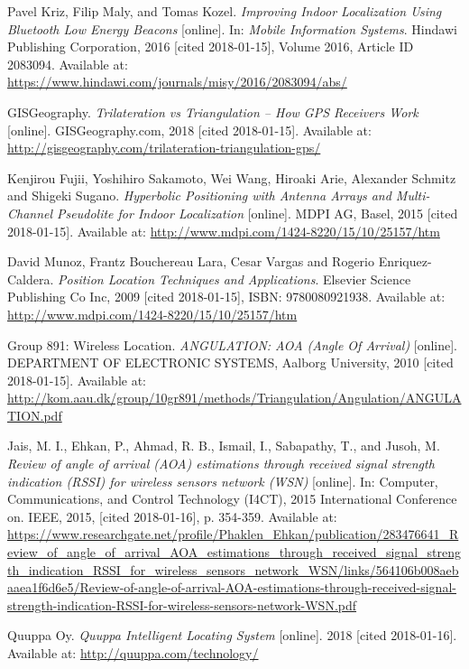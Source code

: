 \begin{thebibliography}{10}
Pavel Kriz, Filip Maly, and Tomas Kozel. \textit{Improving Indoor Localization Using Bluetooth Low Energy Beacons} [online]. In: \textit{Mobile Information Systems}. Hindawi Publishing Corporation, 2016 [cited 2018-01-15], Volume 2016, Article ID 2083094. Available at: \url{https://www.hindawi.com/journals/misy/2016/2083094/abs/}

GISGeography. \textit{Trilateration vs Triangulation – How GPS Receivers Work} [online]. GISGeography.com, 2018 [cited 2018-01-15]. Available at: \url{http://gisgeography.com/trilateration-triangulation-gps/}

Kenjirou Fujii, Yoshihiro Sakamoto, Wei Wang, Hiroaki Arie, Alexander Schmitz and Shigeki Sugano. \textit{Hyperbolic Positioning with Antenna Arrays and Multi-Channel Pseudolite for Indoor Localization} [online]. MDPI AG, Basel, 2015 [cited 2018-01-15]. Available at: \url{http://www.mdpi.com/1424-8220/15/10/25157/htm}

David Munoz, Frantz Bouchereau Lara, Cesar Vargas and Rogerio Enriquez-Caldera. \textit{Position Location Techniques and Applications}. Elsevier Science Publishing Co Inc, 2009 [cited 2018-01-15], ISBN: 9780080921938. Available at: \url{http://www.mdpi.com/1424-8220/15/10/25157/htm}

Group 891: Wireless Location. \textit{ANGULATION: AOA (Angle Of Arrival)} [online]. DEPARTMENT OF ELECTRONIC SYSTEMS, Aalborg University, 2010 [cited 2018-01-15]. Available at: \url{http://kom.aau.dk/group/10gr891/methods/Triangulation/Angulation/ANGULATION.pdf}

Jais, M. I., Ehkan, P., Ahmad, R. B., Ismail, I., Sabapathy, T., and Jusoh, M. \textit{Review of angle of arrival (AOA) estimations through received signal strength indication (RSSI) for wireless sensors network (WSN)} [online]. In: Computer, Communications, and Control Technology (I4CT), 2015 International Conference on. IEEE, 2015, [cited 2018-01-16], p. 354-359. Available at: \url{https://www.researchgate.net/profile/Phaklen_Ehkan/publication/283476641_Review_of_angle_of_arrival_AOA_estimations_through_received_signal_strength_indication_RSSI_for_wireless_sensors_network_WSN/links/564106b008aebaaea1f6d6e5/Review-of-angle-of-arrival-AOA-estimations-through-received-signal-strength-indication-RSSI-for-wireless-sensors-network-WSN.pdf}

Quuppa Oy. \textit{Quuppa Intelligent Locating System} [online]. 2018 [cited 2018-01-16]. Available at: \url{http://quuppa.com/technology/}


\end{thebibliography}
